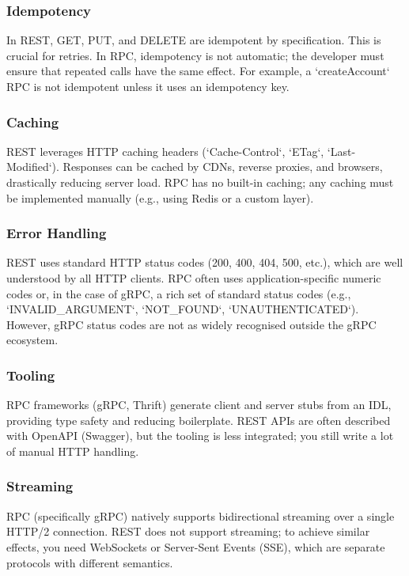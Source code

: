 \documentclass[a4paper]{article}
\begin{document}
\subsubsection{Idempotency}
In REST, GET, PUT, and DELETE are idempotent by specification. This is crucial for retries. In RPC, idempotency is not automatic; the developer must ensure that repeated calls have the same effect. For example, a `createAccount` RPC is not idempotent unless it uses an idempotency key.

\subsubsection{Caching}
REST leverages HTTP caching headers (`Cache-Control`, `ETag`, `Last-Modified`). Responses can be cached by CDNs, reverse proxies, and browsers, drastically reducing server load. RPC has no built-in caching; any caching must be implemented manually (e.g., using Redis or a custom layer).

\subsubsection{Error Handling}
REST uses standard HTTP status codes (200, 400, 404, 500, etc.), which are well understood by all HTTP clients. RPC often uses application-specific numeric codes or, in the case of gRPC, a rich set of standard status codes (e.g., `INVALID\_ARGUMENT`, `NOT\_FOUND`, `UNAUTHENTICATED`). However, gRPC status codes are not as widely recognised outside the gRPC ecosystem.

\subsubsection{Tooling}
RPC frameworks (gRPC, Thrift) generate client and server stubs from an IDL, providing type safety and reducing boilerplate. REST APIs are often described with OpenAPI (Swagger), but the tooling is less integrated; you still write a lot of manual HTTP handling.

\subsubsection{Streaming}
RPC (specifically gRPC) natively supports bidirectional streaming over a single HTTP/2 connection. REST does not support streaming; to achieve similar effects, you need WebSockets or Server-Sent Events (SSE), which are separate protocols with different semantics.
\end{document}
